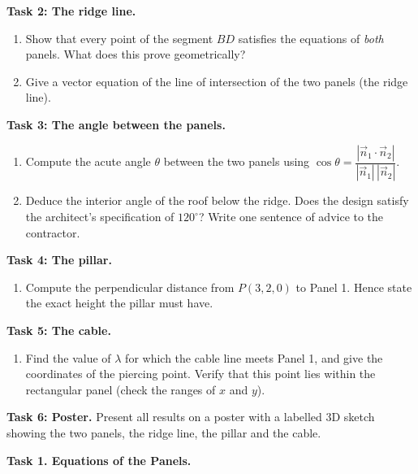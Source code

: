\documentclass[11pt]{article}
\newcounter{popsec}
\newcounter{popsub}
\newcommand{\courssub}[1]{%
  \stepcounter{popsub}%
  \par\vspace{9pt}\noindent{\popxbold\fontsize{11.5}{13}\selectfont\color{popink}{\color{poporange}\thepopsec.\thepopsub}\hspace{6pt}#1}\par\nopagebreak\vspace{4pt}
}
\begin{document}
\textbf{Task 2: The ridge line.}
\begin{enumerate}
\item[3.] Show that every point of the segment $BD$ satisfies the equations of \emph{both} panels. What does this prove geometrically?
\item[4.] Give a vector equation of the line of intersection of the two panels (the ridge line).
\end{enumerate}

\textbf{Task 3: The angle between the panels.}
\begin{enumerate}
\item[5.] Compute the acute angle $\theta$ between the two panels using $\cos\theta = \dfrac{|\vec{n}_1 \cdot \vec{n}_2|}{|\vec{n}_1|\,|\vec{n}_2|}$.
\item[6.] Deduce the interior angle of the roof below the ridge. Does the design satisfy the architect's specification of $120^\circ$? Write one sentence of advice to the contractor.
\end{enumerate}

\textbf{Task 4: The pillar.}
\begin{enumerate}
\item[7.] Compute the perpendicular distance from $P(3,2,0)$ to Panel 1. Hence state the exact height the pillar must have.
\end{enumerate}

\textbf{Task 5: The cable.}
\begin{enumerate}
\item[8.] Find the value of $\lambda$ for which the cable line meets Panel 1, and give the coordinates of the piercing point. Verify that this point lies within the rectangular panel (check the ranges of $x$ and $y$).
\end{enumerate}

\textbf{Task 6: Poster.} Present all results on a poster with a labelled 3D sketch showing the two panels, the ridge line, the pillar and the cable.

\courssub{Model Answer}

\textbf{Task 1. Equations of the Panels.}
\end{document}
